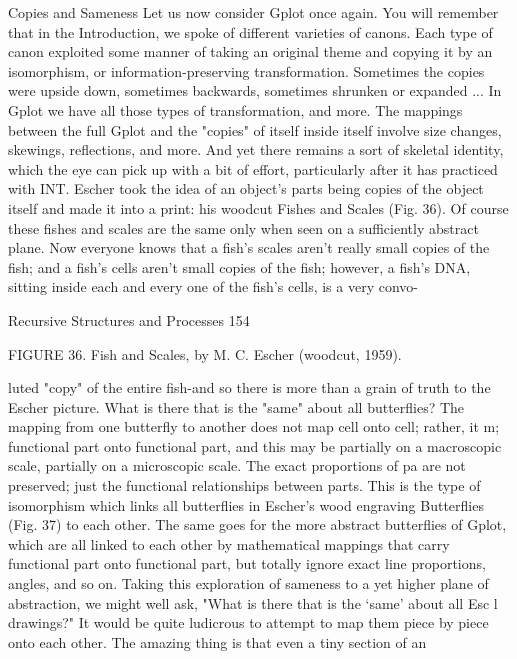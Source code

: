                                  Copies and Sameness
         Let us now consider Gplot once again. You will remember that in the
Introduction, we spoke of different varieties of canons. Each type of canon exploited
some manner of taking an original theme and copying it by an isomorphism, or
information-preserving transformation. Sometimes the copies were upside down,
sometimes backwards, sometimes shrunken or expanded ... In Gplot we have all those
types of transformation, and more. The mappings between the full Gplot and the "copies"
of itself inside itself involve size changes, skewings, reflections, and more. And yet there
remains a sort of skeletal identity, which the eye can pick up with a bit of effort,
particularly after it has practiced with INT.
         Escher took the idea of an object's parts being copies of the object itself and made
it into a print: his woodcut Fishes and Scales (Fig. 36). Of course these fishes and scales
are the same only when seen on a sufficiently abstract plane. Now everyone knows that a
fish's scales aren't really small copies of the fish; and a fish's cells aren't small copies of
the fish; however, a fish's DNA, sitting inside each and every one of the fish's cells, is a
very convo-




Recursive Structures and Processes                                                         154

            FIGURE 36. Fish and Scales, by M. C. Escher (woodcut, 1959).

luted "copy" of the entire fish-and so there is more than a grain of truth to the Escher
picture.
        What is there that is the "same" about all butterflies? The mapping from one
butterfly to another does not map cell onto cell; rather, it m; functional part onto
functional part, and this may be partially on a macroscopic scale, partially on a
microscopic scale. The exact proportions of pa are not preserved; just the functional
relationships between parts. This is the type of isomorphism which links all butterflies in
Escher's wood engraving Butterflies (Fig. 37) to each other. The same goes for the more
abstract butterflies of Gplot, which are all linked to each other by mathematical mappings
that carry functional part onto functional part, but totally ignore exact line proportions,
angles, and so on.
        Taking this exploration of sameness to a yet higher plane of abstraction, we might
well ask, "What is there that is the `same' about all Esc l drawings?" It would be quite
ludicrous to attempt to map them piece by piece onto each other. The amazing thing is
that even a tiny section of an




